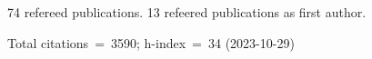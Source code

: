 74 refereed publications. 13 refeered publications as first author.

Total citations~=~3590; h-index~=~34 (2023-10-29)